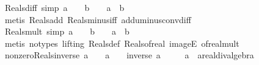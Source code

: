 \begin{isabellebody}
{\isafoldproof}%
%
\isadelimproof
\isanewline
%
\endisadelimproof
\isanewline
{}\isamarkupfalse%
\ Reals{\isacharunderscore}{\kern0pt}diff\ {\isacharbrackleft}{\kern0pt}simp{\isacharbrackright}{\kern0pt}{\isacharcolon}{\kern0pt}\ {\isachardoublequoteopen}a\ {\isasymin}\ {\isasymreal}\ {\isasymLongrightarrow}\ b\ {\isasymin}\ {\isasymreal}\ {\isasymLongrightarrow}\ a\ {\isacharminus}{\kern0pt}\ b\ {\isasymin}\ {\isasymreal}{\isachardoublequoteclose}\isanewline
%
\isadelimproof
\ \ %
\endisadelimproof
%
\isatagproof
{}\isamarkupfalse%
\ {\isacharparenleft}{\kern0pt}metis\ Reals{\isacharunderscore}{\kern0pt}add\ Reals{\isacharunderscore}{\kern0pt}minus{\isacharunderscore}{\kern0pt}iff\ add{\isacharunderscore}{\kern0pt}uminus{\isacharunderscore}{\kern0pt}conv{\isacharunderscore}{\kern0pt}diff{\isacharparenright}{\kern0pt}%
\endisatagproof
{\isafoldproof}%
%
\isadelimproof
\isanewline
%
\endisadelimproof
\isanewline
{}\isamarkupfalse%
\ Reals{\isacharunderscore}{\kern0pt}mult\ {\isacharbrackleft}{\kern0pt}simp{\isacharbrackright}{\kern0pt}{\isacharcolon}{\kern0pt}\ {\isachardoublequoteopen}a\ {\isasymin}\ {\isasymreal}\ {\isasymLongrightarrow}\ b\ {\isasymin}\ {\isasymreal}\ {\isasymLongrightarrow}\ a\ {\isacharasterisk}{\kern0pt}\ b\ {\isasymin}\ {\isasymreal}{\isachardoublequoteclose}\isanewline
%
\isadelimproof
\ \ %
\endisadelimproof
%
\isatagproof
{}\isamarkupfalse%
\ {\isacharparenleft}{\kern0pt}metis\ {\isacharparenleft}{\kern0pt}no{\isacharunderscore}{\kern0pt}types{\isacharcomma}{\kern0pt}\ lifting{\isacharparenright}{\kern0pt}\ Reals{\isacharunderscore}{\kern0pt}def\ Reals{\isacharunderscore}{\kern0pt}of{\isacharunderscore}{\kern0pt}real\ imageE\ of{\isacharunderscore}{\kern0pt}real{\isacharunderscore}{\kern0pt}mult{\isacharparenright}{\kern0pt}%
\endisatagproof
{\isafoldproof}%
%
\isadelimproof
\isanewline
%
\endisadelimproof
\isanewline
{}\isamarkupfalse%
\ nonzero{\isacharunderscore}{\kern0pt}Reals{\isacharunderscore}{\kern0pt}inverse{\isacharcolon}{\kern0pt}\ {\isachardoublequoteopen}a\ {\isasymin}\ {\isasymreal}\ {\isasymLongrightarrow}\ a\ {\isasymnoteq}\ {}\ {\isasymLongrightarrow}\ inverse\ a\ {\isasymin}\ {\isasymreal}{\isachardoublequoteclose}\isanewline
\ \ \ a\ {\isacharcolon}{\kern0pt}{\isacharcolon}{\kern0pt}\ {\isachardoublequoteopen}{\isacharprime}{\kern0pt}a{\isacharcolon}{\kern0pt}{\isacharcolon}{\kern0pt}real{\isacharunderscore}{\kern0pt}div{\isacharunderscore}{\kern0pt}algebra{\isachardoublequoteclose}\isanewline
%
\isadelimproof

\end{isabellebody}
